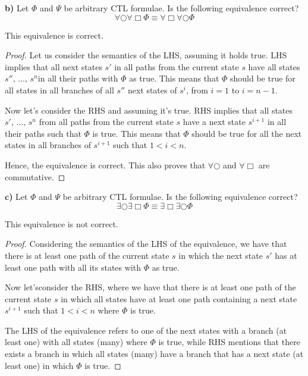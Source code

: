 \documentclass[titlepage, letterpaper, fleqn]{article}
\begin{document}
{\large \textbf{b)} Let \(\Phi\) and \(\Psi\) be arbitrary CTL formulae. Is the following equivalence correct?
\[\forall \bigcirc \forall \Box \Phi \equiv \forall \Box \forall \bigcirc \Phi\]}

This equivalence is correct.

\begin{proof}
Let us consider the semantics of the LHS, assuming it holds true.
LHS implies that all next states \(s'\) in all paths from the current state \(s\) have all states \(s'',\, \dots,\, s^n\)in all their paths with \(\Phi\) as true. This means that \(\Phi\) should be true for all states in all branches of all \(s''\) next states of \(s^i\), from \(i=1\) to \(i=n-1\).

Now let's consider the RHS and assuming it's true.
RHS implies that all states \(s', \, \dots , \, s^n\) from all paths from the current state \(s\) have a next state \(s^{i+1}\) in all their paths such that \(\Phi\) is true. This means that \(\Phi\) should be true for all the next states in all branches of \(s^{i+1}\) such that \(1<i<n\).

Hence, the equivalence is correct. This also proves that \(\forall \bigcirc\) and \(\forall \Box\) are commutative.

\end{proof}

{\large \textbf{c)} Let \(\Phi\) and \(\Psi\) be arbitrary CTL formulae. Is the following equivalence correct?
\[\exists \bigcirc \exists \Box \Phi \equiv \exists \Box \exists \bigcirc \Phi\]}

This equivalence is not correct.

\begin{proof}
Considering the semantics of the LHS of the equivalence, we have that there is at least one path of the current state \(s\) in which the next state \(s'\) has at least one path with all its states with \(\Phi\) as true.

Now let'sconsider the RHS, where we have that there is at least one path of the current state \(s\) in which all states have at least one path containing a next state \(s^{i+1}\) such that \(1<i<n\) where \(\Phi\) is true.

The LHS of the equivalence refers to one of the next states with a branch (at least one) with all states (many) where \(\Phi\) is true, while RHS mentions that there exists a branch in which all states (many) have a branch that has a next state (at least one) in which \(\Phi\) is true.
\end{proof}
\end{document}

